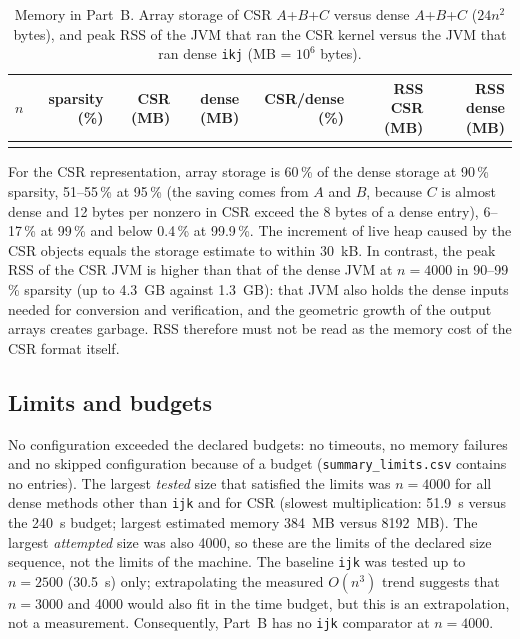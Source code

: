 \documentclass[11pt,a4paper]{article}
\begin{document}
\begin{table}[t]\centering\small
\caption{Memory in Part~B. Array storage of CSR $A$+$B$+$C$ versus dense $A$+$B$+$C$ ($24n^2$ bytes), and peak RSS of the JVM that ran the CSR kernel versus the JVM that ran dense \texttt{ikj} (MB = $10^6$ bytes).}\label{tab:sparsemem}
\begin{tabular}{@{}rrrrrrr@{}}\toprule
$n$ & sparsity (\%) & CSR (MB) & dense (MB) & CSR/dense (\%) & RSS CSR (MB) & RSS dense (MB)\\\midrule
\\\bottomrule
\end{tabular}
\end{table}
For the CSR representation, array storage is 60\,\% of the dense storage at 90\,\% sparsity, 51--55\,\% at 95\,\% (the saving comes from $A$ and $B$, because $C$ is almost dense and 12 bytes per nonzero in CSR exceed the 8 bytes of a dense entry), 6--17\,\% at 99\,\% and below 0.4\,\% at 99.9\,\%. The increment of live heap caused by the CSR objects equals the storage estimate to within 30~kB. In contrast, the peak RSS of the CSR JVM is higher than that of the dense JVM at $n=4000$ in 90--99\,\% sparsity (up to 4.3~GB against 1.3~GB): that JVM also holds the dense inputs needed for conversion and verification, and the geometric growth of the output arrays creates garbage. RSS therefore must not be read as the memory cost of the CSR format itself.

\subsection{Limits and budgets}\label{sec:limits}
No configuration exceeded the declared budgets: no timeouts, no memory failures and no skipped configuration because of a budget (\texttt{summary\_limits.csv} contains no entries). The largest \emph{tested} size that satisfied the limits was $n=4000$ for all dense methods other than \texttt{ijk} and for CSR (slowest multiplication: 51.9~s versus the 240~s budget; largest estimated memory 384~MB versus 8192~MB). The largest \emph{attempted} size was also 4000, so these are the limits of the declared size sequence, not the limits of the machine. The baseline \texttt{ijk} was tested up to $n=2500$ (30.5~s) only; extrapolating the measured $O(n^3)$ trend suggests that $n=3000$ and 4000 would also fit in the time budget, but this is an extrapolation, not a measurement. Consequently, Part~B has no \texttt{ijk} comparator at $n=4000$.
\end{document}
